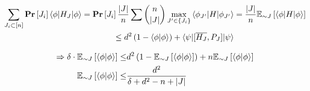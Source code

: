 \[ \begin{split}
\sum_{J_i \subset [n]} \prb{J_i} \Obs{\phi}{H_J} = \prb{J_i}\frac{|J|}{n}\sum\binom{n}{|J|}\max_{J^\prime \in \{J_i\}} \Obs{\phi_{J^\prime}}{H}  & = \frac{|J|}{n} \Exp{\braket{\phi|H|\phi}}{\sim J} \\ \le d^2\left(1 - \braket{\phi|\phi}\right) + \Obs{\psi}{[\overline{H_J},P_J]}
\end{split}
\]



\[ \begin{split}
\Rightarrow  \delta \cdot \Exp{\braket{\phi|\phi}}{\sim J}  \le &  d^2 \left( 1- \Exp{\braket{\phi|\phi}}{\sim J} \right) + n \Exp{\braket{\phi|\phi}}{\sim J} \\
\Exp{\braket{\phi|\phi}}{\sim J} \le & \frac{d^2}{\delta +d^2 - n + |J| }
\end{split}
\]
